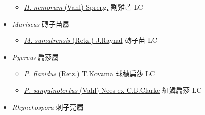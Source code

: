 \begin{itemize}
  \begin{itemize}
        \item[] \href{http://www.theplantlist.org/tpl1.1/search?q=Hypolytrum+nemorum}{\textit{H. nemorum} (Vahl) Spreng.}   割雞芒 LC
  \end{itemize}
 \item[] \textit{Mariscus} 磚子苗屬
                    
  \begin{itemize}
        \item[] \href{http://www.theplantlist.org/tpl1.1/search?q=Mariscus+sumatrensis}{\textit{M. sumatrensis} (Retz.) J.Raynal}   磚子苗 LC
  \end{itemize}
 \item[] \textit{Pycreus} 扁莎屬
                    
  \begin{itemize}
        \item[] \href{http://www.theplantlist.org/tpl1.1/search?q=Pycreus+flavidus}{\textit{P. flavidus} (Retz.) T.Koyama}   球穗扁莎 LC
        \item[] \href{http://www.theplantlist.org/tpl1.1/search?q=Pycreus+sanguinolentus}{\textit{P. sanguinolentus} (Vahl) Nees ex C.B.Clarke}   紅鱗扁莎 LC
  \end{itemize}
 \item[] \textit{Rhynchospora} 刺子莞屬
                    

\end{itemize}
